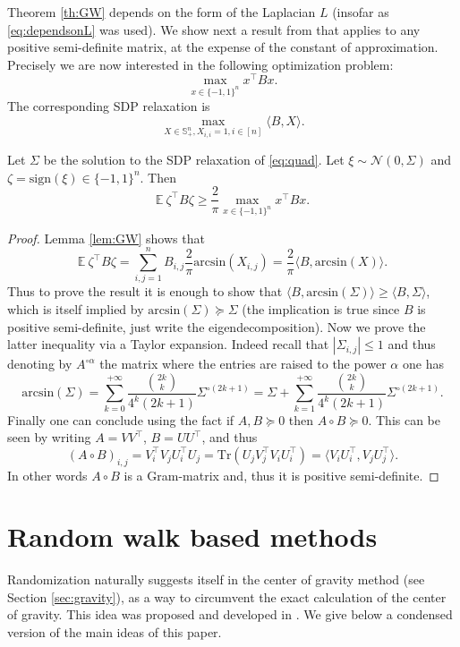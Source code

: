 \documentclass[openany]{now}
\newcommand{\E}{\mathbb{E}}
\newcommand{\cN}{\mathcal{N}}
\begin{document}
Theorem \ref{th:GW} depends on the form of the Laplacian $L$ (insofar as \eqref{eq:dependsonL} was used). We show next a result from \cite{Nes97} that applies to any positive semi-definite matrix, at the expense of the constant of approximation. Precisely we are now interested in the following optimization problem:
\begin{equation} \label{eq:quad}
\max_{x \in \{-1,1\}^n} x^{\top} B x .
\end{equation}
The corresponding SDP relaxation is
$$\max_{X \in \mathbb{S}_+^n, X_{i,i}=1, i \in [n]} \langle B, X \rangle .$$

\begin{theorem}
Let $\Sigma$ be the solution to the SDP relaxation of \eqref{eq:quad}. Let $\xi \sim \cN(0, \Sigma)$ and $\zeta = \mathrm{sign}(\xi) \in \{-1,1\}^n$. Then
$$\E \ \zeta^{\top} B \zeta \geq \frac{2}{\pi} \max_{x \in \{-1,1\}^n} x^{\top} B x .$$
\end{theorem}

\begin{proof}
Lemma \ref{lem:GW} shows that
$$\E \ \zeta^{\top} B \zeta = \sum_{i,j=1}^n B_{i,j} \frac{2}{\pi} \mathrm{arcsin} \left(X_{i,j}\right) = \frac{2}{\pi} \langle B, \mathrm{arcsin}(X) \rangle .$$
Thus to prove the result it is enough to show that $\langle B, \mathrm{arcsin}(\Sigma) \rangle \geq \langle B, \Sigma \rangle$, which is itself implied by $\mathrm{arcsin}(\Sigma) \succeq \Sigma$ (the implication is true since $B$ is positive semi-definite, just write the eigendecomposition). Now we prove the latter inequality via a Taylor expansion. Indeed recall that $|\Sigma_{i,j}| \leq 1$ and thus denoting by $A^{\circ \alpha}$ the matrix where the entries are raised to the power $\alpha$ one has
$$\mathrm{arcsin}(\Sigma) = \sum_{k=0}^{+\infty} \frac{{2k \choose k}}{4^k (2k +1)} \Sigma^{\circ (2k+1)} = \Sigma + \sum_{k=1}^{+\infty} \frac{{2k \choose k}}{4^k (2k +1)} \Sigma^{\circ (2k+1)}.$$
Finally one can conclude using the fact if $A,B \succeq 0$ then $A \circ B \succeq 0$. This can be seen by writing $A= V V^{\top}$, $B=U U^{\top}$, and thus 
$$(A \circ B)_{i,j} = V_i^{\top} V_j U_i^{\top} U_j = \mathrm{Tr}(U_j V_j^{\top} V_i U_i^{\top}) = \langle V_i U_i^{\top}, V_j U_j^{\top} \rangle .$$ In other words $A \circ B$ is a Gram-matrix and, thus it is positive semi-definite.
\end{proof}

\section{Random walk based methods} \label{sec:rwmethod}
Randomization naturally suggests itself in the center of gravity method (see Section \ref{sec:gravity}), as a way to circumvent the exact calculation of the center of gravity. This idea was proposed and developed in \cite{BerVem04}. We give below a condensed version of the main ideas of this paper.
\end{document}
